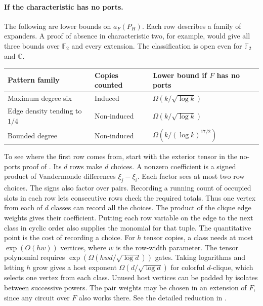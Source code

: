 \documentclass[11pt]{article}
\theoremstyle{definition}
\newcommand{\F}{\mathbb F}
\begin{document}
\paragraph{If the characteristic has no ports.}
The following are lower bounds on \(a_F(P_H)\). Each row describes a
family of expanders. A proof of absence in characteristic two, for
example, would give all three bounds over \(\F_2\) and every extension.
The classification is open even for \(\F_2\) and \(\mathbb C\).
\begin{center}
\begin{tabular}{@{}lll@{}}
\toprule
Pattern family & Copies counted & Lower bound if \(F\) has no ports\\
\midrule
Maximum degree six & Induced & \(\Omega(k/\sqrt{\log k})\)\\
Edge density tending to \(1/4\) & Non-induced & \(\Omega(k/\sqrt{\log k})\)\\
Bounded degree & Non-induced & \(\Omega(k/(\log k)^{17/2})\)\\
\bottomrule
\end{tabular}
\end{center}

To see where the first row comes from, start with the exterior tensor
in the no-ports proof of \cite{circuits}. Its \(d\) rows make \(d\)
choices. A nonzero coefficient is a signed product of Vandermonde
differences \(\xi_j-\xi_i\). Each factor sees at most two row choices.
The signs also factor over pairs. Recording a running count of occupied
slots in each row lets consecutive rows check the required totals.
Thus one vertex from each of \(d\) classes can record all the choices.
The product of the clique edge weights gives their coefficient. Putting
each row variable on the edge to the next class in cyclic order also
supplies the monomial for that tuple. The
quantitative point is the cost of recording a choice. For \(h\) tensor
copies, a class needs at most \(\exp(O(hw))\) vertices, where \(w\)
is the row-width parameter. The tensor polynomial requires
\(\exp(\Omega(hwd/\sqrt{\log d}))\) gates. Taking logarithms and
letting \(h\) grow gives a host exponent \(\Omega(d/\sqrt{\log d})\)
for colorful \(d\)-clique, which selects one vertex from each class.
Unused host vertices can be padded by isolates between successive
powers. The pair weights may be chosen in an extension of \(F\), since
any circuit over \(F\) also works there. See the detailed reduction
in \cite{pairtables}.
\end{document}
